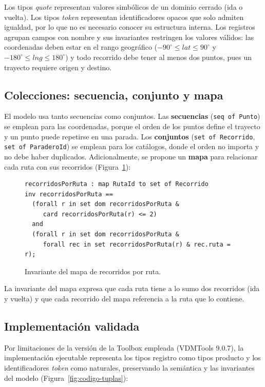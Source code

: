 Los tipos \emph{quote} representan valores simbólicos de un dominio
cerrado (ida o vuelta). Los tipos \emph{token} representan identificadores
opacos que solo admiten igualdad, por lo que no es necesario conocer su
estructura interna. Los registros agrupan campos con nombre y sus
invariantes restringen los valores válidos: las coordenadas deben estar en
el rango geográfico ($-90^{\circ} \le lat \le 90^{\circ}$ y
$-180^{\circ} \le lng \le 180^{\circ}$) y todo recorrido debe tener al
menos dos puntos, pues un trayecto requiere origen y destino.

\subsection{Colecciones: secuencia, conjunto y mapa}
\label{sec:colecciones}

El modelo usa tanto secuencias como conjuntos. Las \textbf{secuencias}
(\texttt{seq of Punto}) se emplean para las coordenadas, porque el orden
de los puntos define el trayecto y un punto puede repetirse en una parada.
Los \textbf{conjuntos} (\texttt{set of Recorrido}, \texttt{set of
ParaderoId}) se emplean para los catálogos, donde el orden no importa y no
debe haber duplicados. Adicionalmente, se propone un \textbf{mapa} para
relacionar cada ruta con sus recorridos (Figura~\ref{fig:codigo-mapa}):

\begin{figure}[!t]
\centering
\begin{lstlisting}
recorridosPorRuta : map RutaId to set of Recorrido
inv recorridosPorRuta ==
  (forall r in set dom recorridosPorRuta &
     card recorridosPorRuta(r) <= 2)
  and
  (forall r in set dom recorridosPorRuta &
     forall rec in set recorridosPorRuta(r) & rec.ruta = r);
\end{lstlisting}
\caption{Invariante del mapa de recorridos por ruta.}
\label{fig:codigo-mapa}
\end{figure}

La invariante del mapa expresa que cada ruta tiene a lo sumo dos
recorridos (ida y vuelta) y que cada recorrido del mapa referencia a la
ruta que lo contiene.

\subsection{Implementación validada}
\label{sec:implementacion}

Por limitaciones de la versión de la Toolbox empleada (VDMTools 9.0.7),
la implementación ejecutable representa los tipos registro como tipos
producto y los identificadores \emph{token} como naturales, preservando la
semántica y las invariantes del modelo (Figura~\ref{fig:codigo-tuplas}):

